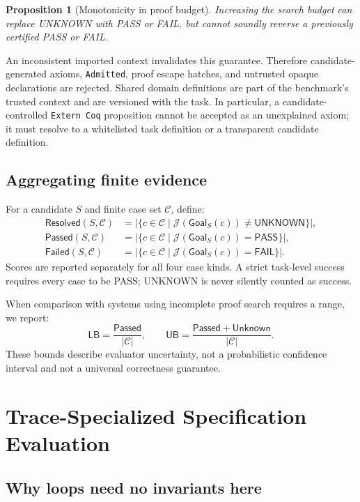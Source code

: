 \documentclass[10pt]{article}
\newtheorem{proposition}{Proposition}
\newcommand{\pass}{\textsf{PASS}}
\newcommand{\fail}{\textsf{FAIL}}
\newcommand{\unknown}{\textsf{UNKNOWN}}
\newcommand{\judge}{\mathcal{J}}
\newcommand{\testsuite}{\mathcal{C}}
\newcommand{\goal}{\mathsf{Goal}}
\begin{document}
\begin{proposition}[Monotonicity in proof budget]
Increasing the search budget can replace \unknown{} with \pass{} or \fail{},
but cannot soundly reverse a previously certified \pass{} or \fail{}.
\end{proposition}

An inconsistent imported context invalidates this guarantee.  Therefore
candidate-generated axioms, \texttt{Admitted}, proof escape hatches, and
untrusted opaque declarations are rejected.  Shared domain definitions are
part of the benchmark's trusted context and are versioned with the task.
In particular, a candidate-controlled \texttt{Extern Coq} proposition cannot
be accepted as an unexplained axiom; it must resolve to a whitelisted task
definition or a transparent candidate definition.

\subsection{Aggregating finite evidence}

For a candidate $S$ and finite case set $\testsuite$, define:
\[
\begin{split}
\mathsf{Resolved}(S,\testsuite)
  &= |\{c\in\testsuite\mid\judge(\goal_S(c))\neq\unknown\}|,\\
\mathsf{Passed}(S,\testsuite)
  &= |\{c\in\testsuite\mid\judge(\goal_S(c))=\pass\}|,\\
\mathsf{Failed}(S,\testsuite)
  &= |\{c\in\testsuite\mid\judge(\goal_S(c))=\fail\}|.
\end{split}
\]
Scores are reported separately for all four case kinds.  A strict task-level
success requires every case to be \pass; \unknown{} is never silently counted
as success.

When comparison with systems using incomplete proof search requires a range,
we report:
\[
\mathsf{LB}=\frac{\mathsf{Passed}}{|\testsuite|},
\qquad
\mathsf{UB}=\frac{\mathsf{Passed}+\mathsf{Unknown}}{|\testsuite|}.
\]
These bounds describe evaluator uncertainty, not a probabilistic confidence
interval and not a universal correctness guarantee.

\section{Trace-Specialized Specification Evaluation}
\label{sec:trace}

\subsection{Why loops need no invariants here}
\end{document}
